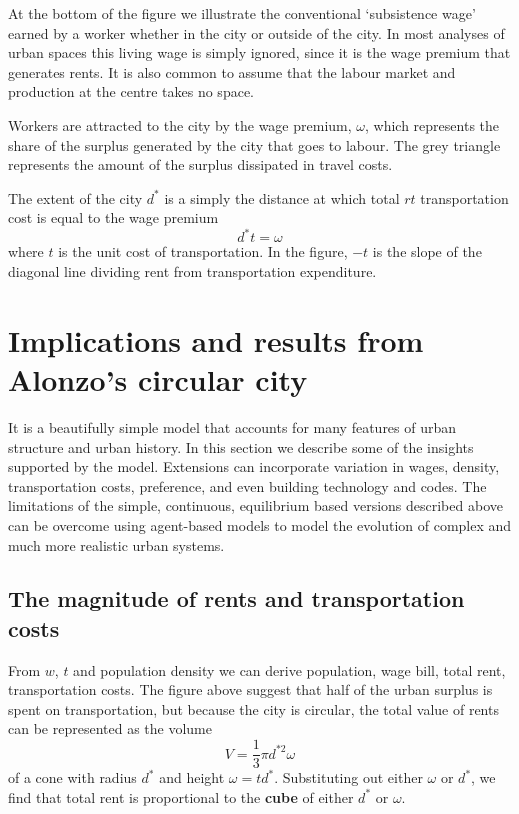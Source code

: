 At the bottom of the figure we illustrate the conventional `subsistence wage'  earned by a worker whether in the city or outside of the city.   In most analyses of urban spaces this living wage is simply ignored, since it is the wage premium that generates rents.  It is also common to assume that the labour market and production at the centre takes no space.   


Workers are attracted to the city by the wage premium, $\omega$,  which represents the share of the surplus generated by the city that goes to labour.  The grey triangle represents the amount of the surplus dissipated in travel costs.  

The extent  of the city  $d^*$ is a simply the distance at which total $rt$ transportation cost  is equal to the wage premium
\[d^* t= \omega\]
where $t$ is the unit cost of transportation. In the figure, $-t$ is the slope of the diagonal line dividing rent from transportation expenditure.



 \section{Implications and results from Alonzo's circular city}
 It is a beautifully simple model that accounts for many features of urban structure and urban history. In this section we describe some of the insights supported by the model. Extensions can incorporate variation in wages, density, transportation costs,  preference, and even building technology and codes. The limitations of the simple, continuous, equilibrium based versions described above can be overcome using agent-based models to model the evolution of complex and much more realistic urban systems. 

 \subsection{The magnitude of rents and transportation costs}
 From $w$, $t$ and population density we can derive population, wage bill, total rent, transportation costs. The figure above suggest that  half of the urban surplus is spent on transportation, but because the city is circular, the total value of rents can be represented as the volume  \[ V=\frac{1}{3}\pi  d^{*2} \omega \]
of a cone with radius $d^*$ and  height $\omega = td^*$. Substituting out either  $\omega$ or  $d^*$, we find that total rent is  proportional to the \textbf{cube} of either  $d^*$ or $\omega$. 

